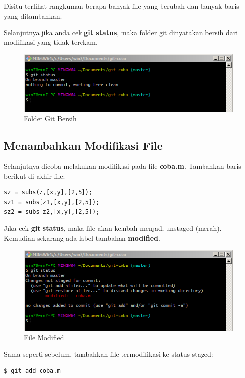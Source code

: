 \documentclass[12pt]{book}
\begin{document}
	Disitu terlihat rangkuman berapa banyak file yang berubah dan banyak baris yang ditambahkan.

	\newpage
	Selanjutnya jika anda cek \textbf{git status}, maka folder git dinyatakan bersih dari modifikasi yang tidak terekam.

	\begin{figure}[!ht]
		\centering
		\includegraphics[width=400pt]{images/git6}
		\caption{Folder Git Bersih}
	\end{figure}

	\subsection{Menambahkan Modifikasi File}

	Selanjutnya dicoba melakukan modifikasi pada file \textbf{coba.m}.
	Tambahkan baris berikut di akhir file:
	\begin{verbatim}
sz = subs(z,[x,y],[2,5]);
sz1 = subs(z1,[x,y],[2,5]);
sz2 = subs(z2,[x,y],[2,5]);
	\end{verbatim}

	Jika cek \textbf{git status}, maka file akan kembali menjadi unstaged (merah).
	Kemudian sekarang ada label tambahan \textbf{modified}.

	\begin{figure}[!ht]
		\centering
		\includegraphics[width=400pt]{images/git7}
		\caption{File Modified}
	\end{figure}

	Sama seperti sebelum, tambahkan file termodifikasi ke status staged:
	\begin{verbatim}
$ git add coba.m
	\end{verbatim}
\end{document}
